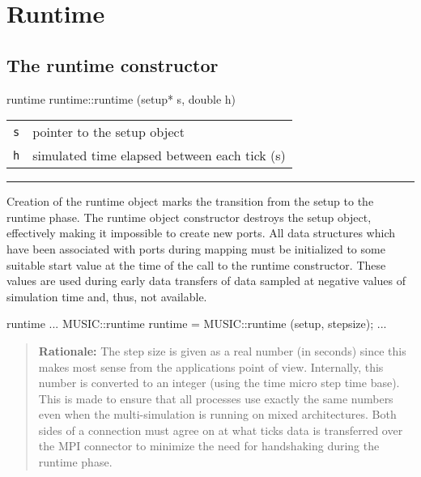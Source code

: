 \documentclass[a4paper]{report}
\makeatletter
\newenvironment{rationale}%
{\par\begin{quote}\textbf{Rationale:}}%
{\par\end{quote}}
\newenvironment{parameters}%
{\begin{tabular}{@{\hspace{2em}}lp{0.6\textwidth}}}%
{\end{tabular}\par\vspace{1mm}\par\hrule\par\vspace{5mm}}
\makeatother
\begin{document}
\section{Runtime}

\subsection{The runtime constructor}

\begin{head}{runtime}
  runtime::runtime (setup* s, double h)
\end{head}
\begin{parameters}
  \lstinline|s| & pointer to the setup object \\
  \lstinline|h| & simulated time elapsed between each tick (s) \\
\end{parameters}

Creation of the runtime object marks the transition from the setup to
the runtime phase.  The runtime object constructor destroys the setup
object, effectively making it impossible to create new ports.  All
data structures which have been associated with ports during mapping
must be initialized to some suitable start value at the time of the
call to the runtime constructor.  These values are used during early
data transfers of data sampled at negative values of simulation time
and, thus, not available.

\begin{code}{runtime}
  ...
  MUSIC::runtime runtime = MUSIC::runtime (setup, stepsize);
  ...
\end{code}

\begin{rationale}
  The step size is given as a real number (in seconds) since this
  makes most sense from the applications point of view.  Internally,
  this number is converted to an integer (using the time micro step
  time base).  This is made to ensure that all processes use exactly
  the same numbers even when the multi-simulation is running on mixed
  architectures.  Both sides of a connection must agree on at what
  ticks data is transferred over the MPI connector to minimize the
  need for handshaking during the runtime phase.
\end{rationale}
\end{document}
